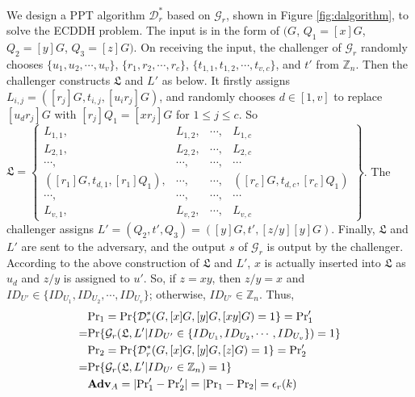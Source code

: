 We design a PPT algorithm $\mathcal{D}^*_r$ based on $\mathcal{G}_r$, shown in Figure \ref{fig:dalgorithm}, to solve the ECDDH problem.
The input is in the form of $(G$, $Q_1=[x]G$, $Q_2=[y]G$, $Q_3=[z]G)$.
On receiving the input, the challenger of $\mathcal{G}_r$ randomly chooses
 $\{u_1, u_2, \cdots, u_v\}$, $\{r_1, r_2, \cdots, r_c\}$, $\{t_{1, 1}, t_{1, 2}, \cdots, t_{v, c}\}$, and $t'$ from $\mathbb{Z}_n$.
Then the challenger constructs $\mathfrak{L}$ and $L'$ as below.
It firstly assigns $L_{i, j} = ([r_j]G, t_{i, j}, [u_ir_j]G)$, %
    and randomly chooses $d \in [1, v]$ to
 replace $[u_d r_j]G$ with $[r_j]Q_1=[xr_j]G$ for $1\leq j \leq c$.
So $\mathfrak{L}=\left \{ \begin{matrix}
L_{1,1},&L_{1,2},&\cdots,&L_{1,c}\\
L_{2,1},& L_{2,2},&\cdots,&L_{2,c}\\
\cdots,&\cdots,&\cdots,&\cdots\\
([r_{1}]G, t_{d, 1}, [r_{1}]Q_1),&\cdots,&\cdots,&([r_{c}]G, t_{d, c}, [r_{c}]Q_1)\\
\cdots,&\cdots,&\cdots,&\cdots\\
L_{v,1},&L_{v,2},&\cdots,&L_{v,c}
\end{matrix}\right\}$.
%
The challenger assigns $L' = (Q_2, t', Q_3) = ([y]G, t', [z/y][y]G)$.
Finally,
    $\mathfrak{L}$ and $L'$ are sent to the adversary,
        and the output $s$ of $\mathcal{G}_r$ is output by the challenger.
According to the above construction of $\mathfrak{L}$ and $L'$,
    $x$ is actually inserted into $\mathfrak{L}$ as $u_d$
    and $z/y$ is assigned to $u'$.
So, if $z = xy$, then $z/y=x$ and $ID_{U'} \in \{ID_{U_1}, ID_{U_2}, \cdots, ID_{U_v}\}$;
    otherwise, $ID_{U'} \in \mathbb{Z}_n$.
Thus,
\begin{align*}
&{\rm Pr}_1={\rm Pr}\{\mathcal{D}^*_r(G, [x]G, [y]G, [xy]G)=1\}={\rm Pr}'_1 \\=&  {\rm Pr}\{\mathcal{G}_r(\mathfrak{L}, L'|ID_{U'} \in \{ID_{U_1}, ID_{U_2}, \cdots, ID_{U_v}\})=1\} \\
&{\rm Pr}_2={\rm Pr}\{\mathcal{D}^*_r(G, [x]G, [y]G, [z]G)=1\} ={\rm Pr}'_2 \\=&  {\rm Pr}\{\mathcal{G}_r(\mathfrak{L}, L'|ID_{U'} \in \mathbb{Z}_n)=1\}\\
&{\mathbf{Adv}}_{A}=|{\rm Pr}'_1-{\rm Pr}'_2|=|{\rm Pr}_1-{\rm Pr}_2|=\epsilon_{r}(k)
\end{align*}

